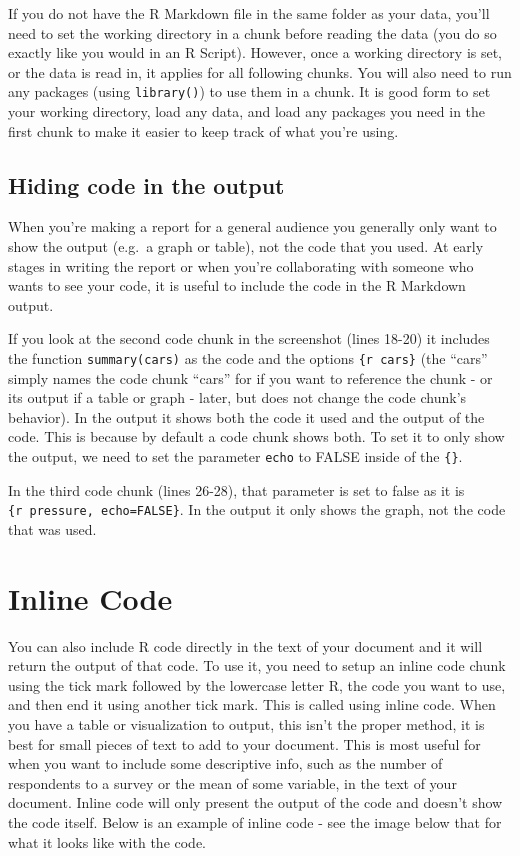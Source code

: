 \documentclass[
  a4paper,
]{krantz}
\begin{document}
If you do not have the R Markdown file in the same folder as
your data, you'll need to set the working directory in a
chunk before reading the data (you do so exactly like you
would in an R Script). However, once a working directory is
set, or the data is read in, it applies for all following
chunks. You will also need to run any packages (using
\texttt{library()}) to use them in a chunk. It is good form
to set your working directory, load any data, and load any
packages you need in the first chunk to make it easier to
keep track of what you're using.

\hypertarget{hiding-code-in-the-output}{%
\subsection{Hiding code in the
output}\label{hiding-code-in-the-output}}

When you're making a report for a general audience you
generally only want to show the output (e.g.~a graph or
table), not the code that you used. At early stages in
writing the report or when you're collaborating with someone
who wants to see your code, it is useful to include the code
in the R Markdown output.

If you look at the second code chunk in the screenshot
(lines 18-20) it includes the function
\texttt{summary(cars)} as the code and the options
\texttt{\{r\ cars\}} (the ``cars'' simply names the code
chunk ``cars'' for if you want to reference the chunk - or
its output if a table or graph - later, but does not change
the code chunk's behavior). In the output it shows both the
code it used and the output of the code. This is because by
default a code chunk shows both. To set it to only show the
output, we need to set the parameter \texttt{echo} to FALSE
inside of the \texttt{\{\}}.

In the third code chunk (lines 26-28), that parameter is set
to false as it is \texttt{\{r\ pressure,\ echo=FALSE\}}. In
the output it only shows the graph, not the code that was
used.

\hypertarget{inline-code}{%
\section{Inline Code}\label{inline-code}}

You can also include R code directly in the text of your
document and it will return the output of that code. To use
it, you need to setup an inline code chunk using the tick
mark followed by the lowercase letter R, the code you want
to use, and then end it using another tick mark. This is
called using inline code. When you have a table or
visualization to output, this isn't the proper method, it is
best for small pieces of text to add to your document. This
is most useful for when you want to include some descriptive
info, such as the number of respondents to a survey or the
mean of some variable, in the text of your document. Inline
code will only present the output of the code and doesn't
show the code itself. Below is an example of inline code -
see the image below that for what it looks like with the
code.
\end{document}
